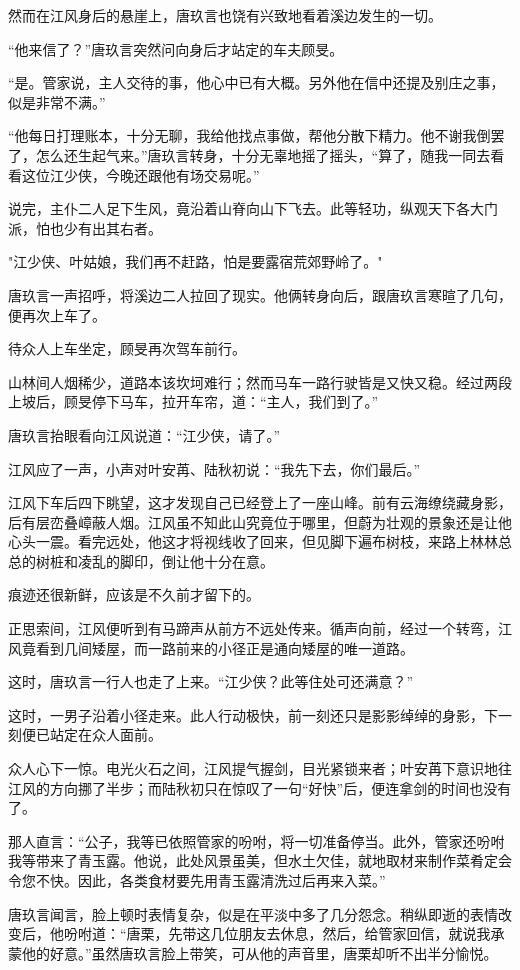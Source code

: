 然而在江风身后的悬崖上，唐玖言也饶有兴致地看着溪边发生的一切。

“他来信了？”唐玖言突然问向身后才站定的车夫顾旻。

“是。管家说，主人交待的事，他心中已有大概。另外他在信中还提及别庄之事，似是非常不满。”

“他每日打理账本，十分无聊，我给他找点事做，帮他分散下精力。他不谢我倒罢了，怎么还生起气来。”唐玖言转身，十分无辜地摇了摇头，“算了，随我一同去看看这位江少侠，今晚还跟他有场交易呢。”

说完，主仆二人足下生风，竟沿着山脊向山下飞去。此等轻功，纵观天下各大门派，怕也少有出其右者。

"江少侠、叶姑娘，我们再不赶路，怕是要露宿荒郊野岭了。"

唐玖言一声招呼，将溪边二人拉回了现实。他俩转身向后，跟唐玖言寒暄了几句，便再次上车了。

待众人上车坐定，顾旻再次驾车前行。

山林间人烟稀少，道路本该坎坷难行；然而马车一路行驶皆是又快又稳。经过两段上坡后，顾旻停下马车，拉开车帘，道：“主人，我们到了。”

唐玖言抬眼看向江风说道：“江少侠，请了。”

江风应了一声，小声对叶安苒、陆秋初说：“我先下去，你们最后。”

江风下车后四下眺望，这才发现自己已经登上了一座山峰。前有云海缭绕藏身影，后有层峦叠嶂蔽人烟。江风虽不知此山究竟位于哪里，但蔚为壮观的景象还是让他心头一震。看完远处，他这才将视线收了回来，但见脚下遍布树枝，来路上林林总总的树桩和凌乱的脚印，倒让他十分在意。

痕迹还很新鲜，应该是不久前才留下的。

正思索间，江风便听到有马蹄声从前方不远处传来。循声向前，经过一个转弯，江风竟看到几间矮屋，而一路前来的小径正是通向矮屋的唯一道路。

这时，唐玖言一行人也走了上来。“江少侠？此等住处可还满意？”

这时，一男子沿着小径走来。此人行动极快，前一刻还只是影影绰绰的身影，下一刻便已站定在众人面前。

众人心下一惊。电光火石之间，江风提气握剑，目光紧锁来者；叶安苒下意识地往江风的方向挪了半步；而陆秋初只在惊叹了一句“好快”后，便连拿剑的时间也没有了。

那人直言：“公子，我等已依照管家的吩咐，将一切准备停当。此外，管家还吩咐我等带来了青玉露。他说，此处风景虽美，但水土欠佳，就地取材来制作菜肴定会令您不快。因此，各类食材要先用青玉露清洗过后再来入菜。”

唐玖言闻言，脸上顿时表情复杂，似是在平淡中多了几分怨念。稍纵即逝的表情改变后，他吩咐道：“唐栗，先带这几位朋友去休息，然后，给管家回信，就说我承蒙他的好意。”虽然唐玖言脸上带笑，可从他的声音里，唐栗却听不出半分愉悦。

